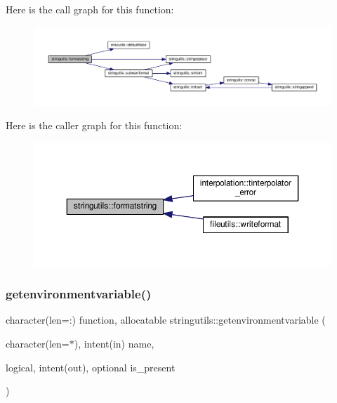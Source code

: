 Here is the call graph for this function\+:
\nopagebreak
\begin{figure}[H]
\begin{center}
\leavevmode
\includegraphics[width=350pt]{namespacestringutils_a27d23a05ef709f393291b263dbbd78c3_cgraph}
\end{center}
\end{figure}
Here is the caller graph for this function\+:
\nopagebreak
\begin{figure}[H]
\begin{center}
\leavevmode
\includegraphics[width=350pt]{namespacestringutils_a27d23a05ef709f393291b263dbbd78c3_icgraph}
\end{center}
\end{figure}
\mbox{\label{namespacestringutils_a7869404fd42c1f41212cbd62a5e225f3}} 
\subsubsection{\texorpdfstring{getenvironmentvariable()}{getenvironmentvariable()}}
{\footnotesize\ttfamily character(len=\+:) function, allocatable stringutils\+::getenvironmentvariable (\begin{DoxyParamCaption}\item[{character(len=$\ast$), intent(in)}]{name,  }\item[{logical, intent(out), optional}]{is\+\_\+present }\end{DoxyParamCaption})}



